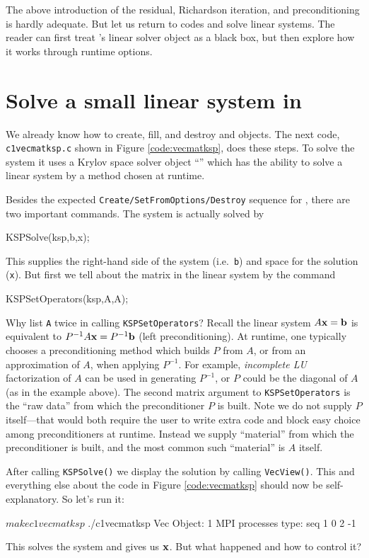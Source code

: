 \medskip
The above introduction of the residual, Richardson iteration, and preconditioning is hardly adequate.  But let us return to \PETSc codes and solve linear systems.  The reader can first treat \PETSc's linear solver object as a black box, but then explore how it works through runtime options.

\section{Solve a small linear system in \PETSc}

We already know how to create, fill, and destroy \pVec and \pMat objects.  The next code, \texttt{c1vecmatksp.c} shown in Figure \ref{code:vecmatksp}, does these steps.  To solve the system it uses a Krylov space solver object ``\pKSP'' which has the ability to solve a linear system by a method chosen at runtime.

Besides the expected \texttt{Create/SetFromOptions/Destroy} sequence for \pKSP, there are two important commands.  The system is actually solved by
\begin{code}
KSPSolve(ksp,b,x);
\end{code}
This supplies the right-hand side of the system (i.e.~\pVec \texttt{b}) and space for the solution (\pVec \texttt{x}).  But first we tell \pKSP about the matrix in the linear system by the command
\begin{code}
KSPSetOperators(ksp,A,A);
\end{code}

Why list \texttt{A} twice in calling \texttt{KSPSetOperators}?  Recall the linear system $A\mathbf{x}=\mathbf{b}$ is equivalent to $P^{-1} A \mathbf{x} = P^{-1} \mathbf{b}$ (left preconditioning).  At runtime, one typically chooses a preconditioning method which builds $P$ from $A$, or from an approximation of $A$, when applying $P^{-1}$.  For example, \emph{incomplete LU} factorization of $A$ can be used in generating $P^{-1}$, or $P$ could be the diagonal of $A$ (as in the example above).  The second matrix argument to \texttt{KSPSetOperators} is the ``raw data'' from which the preconditioner $P$ is built.  Note we do not supply $P$ itself---that would both require the user to write extra code and block easy choice among preconditioners at runtime.  Instead we supply ``material'' from which the preconditioner is built, and the most common such ``material'' is $A$ itself.

After calling \texttt{KSPSolve()} we display the solution \pVec by calling \texttt{VecView()}.  This and everything else about the code in Figure \ref{code:vecmatksp} should now be self-explanatory.  So let's run it:
\begin{cline}
$ make c1vecmatksp
$ ./c1vecmatksp
Vec Object: 1 MPI processes
  type: seq
1
0
2
-1
\end{cline}
This solves the system and gives us $\mathbf{x}$.  But what happened and how to control it?

